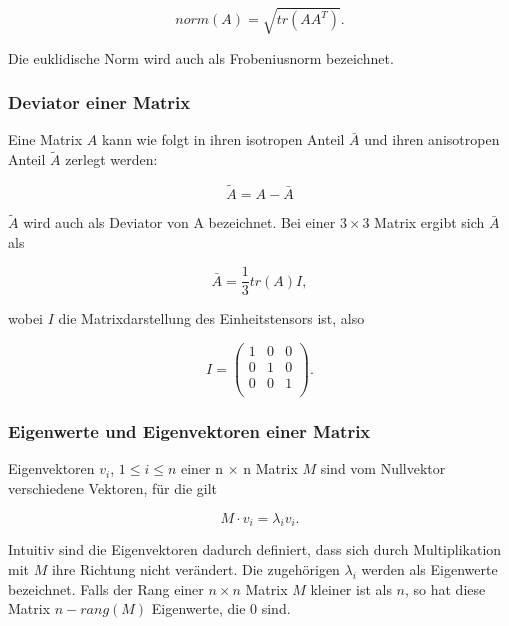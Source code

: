 \documentclass[a4paper,fontsize=12pt,toc=bib,parskip=half,ngerman]{scrartcl}
\begin{document}
\begin{equation}
	norm(A) = \sqrt{tr(AA^T)}.
\end{equation}

Die euklidische Norm wird auch als \glq Frobeniusnorm\grq{} bezeichnet.

\subsubsection{Deviator einer Matrix}
Eine Matrix $A$ kann wie folgt in ihren isotropen Anteil $\bar{A}$ und ihren anisotropen Anteil $\tilde{A}$ zerlegt werden:

\begin{equation}
\tilde{A} = A - \bar{A}
\end{equation}

$\tilde{A}$ wird auch als Deviator von A bezeichnet. Bei einer $3\times 3$ Matrix ergibt sich $\bar{A}$ als

\begin{equation}
\bar{A} = \frac{1}{3}tr(A)I,
\end{equation}

wobei $I$ die Matrixdarstellung des Einheitstensors ist, also

\begin{equation}
	I = 	
	\begin{pmatrix}
		1 & 0 & 0 \\
		0 & 1 & 0 \\
		0 & 0 & 1 \\
	\end{pmatrix}.
\end{equation}

\subsubsection{Eigenwerte und Eigenvektoren einer Matrix}

Eigenvektoren $v_i$, $1\leq i\leq n$ einer n $\times$ n Matrix $M$ sind vom Nullvektor verschiedene Vektoren, f\"ur die gilt

\begin{equation}
	M \cdot v_i = \lambda_i v_i.
\end{equation}

Intuitiv sind die Eigenvektoren dadurch definiert, dass sich durch Multiplikation mit $M$ ihre Richtung nicht ver\"andert. Die zugeh\"origen $\lambda_i$ werden als Eigenwerte bezeichnet.
Falls der Rang einer $n\times n$ Matrix $M$ kleiner ist als $n$, so hat diese Matrix $n - rang(M)$ Eigenwerte, die 0 sind.
\end{document}
